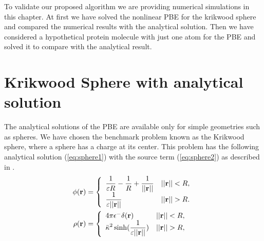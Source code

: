 To validate our proposed algorithm we are providing numerical simulations in this chapter. At first we have solved the nonlinear PBE for the krikwood sphere and compared the numerical results with the analytical solution. Then we have considered a hypothetical protein molecule with just one atom for the PBE and solved it to compare with the analytical result. 


\section{Krikwood Sphere with analytical solution}
\label{krik}

The analytical solutions of the PBE are available only for simple geometries such as spheres. We have chosen the benchmark problem known as the Krikwood sphere, where a sphere has a charge at its center. This problem has the following analytical solution  (\ref{eq:sphere1}) with the source term (\ref{eq:sphere2}) as described in \cite{Geng2013_Fully}. 
\begin{align}
   	\phi({\bf r})&=\left\{\begin{array}{lc}\displaystyle\frac{1}{\varepsilon R}-\frac{1}{R}+\displaystyle\frac{1}{||{\bf r}||} & ||{\bf r}||<R, \\
	\displaystyle\frac{1}{\varepsilon ||{\bf r}||}& ||{\bf r}||>R.\end{array}\right.\label{eq:sphere1}\\
	  	\rho({\bf r})&=\left\{\begin{array}{lc}4\pi \epsilon^-\delta ({\bf r)} & ||{\bf r}||<R, \\ \displaystyle\bar{\kappa}^2\sinh (\frac{1}{\varepsilon ||{\bf r}||}) & ||{\bf r}||>R,\end{array}\right.\label{eq:sphere2}
\end{align}
